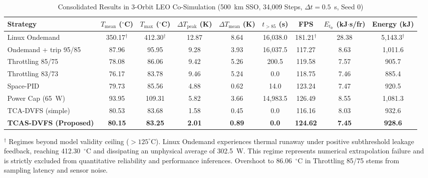 \documentclass[a4paper,fleqn]{cas-dc}
\begin{document}
\begin{table}[t]
\caption{Consolidated Results in 3-Orbit LEO Co-Simulation (500~km SSO, 34,009 Steps, $\Delta t = 0.5$~s, Seed 0)}
\label{tab:results_completo}
\centering
\footnotesize
\setlength{\tabcolsep}{3pt}
\begin{tabular*}{\textwidth}{@{\extracolsep{\fill}}lcccccccc@{}}
\toprule
\textbf{Strategy} & \textbf{$T_{\text{mean}}$ ($^\circ$C)} & \textbf{$T_{\max}$ ($^\circ$C)} & \textbf{$\Delta T_{\text{peak}}$ (K)} & \textbf{$\Delta T_{\text{mean}}$ (K)} & \textbf{$t_{>85}$ (s)} & \textbf{FPS} & \textbf{$E_{t_{\mathrm{fr}}}$ (kJ$\cdot$s/fr)} & \textbf{Energy (kJ)} \\
\midrule
Linux Ondemand & 350.17$^\dagger$ & 412.30$^\dagger$ & 12.87 & 8.64 & 16,038.0 & 181.21$^\dagger$ & 28.38 & 5,143.3$^\dagger$ \\
Ondemand + trip 95/85 & 87.96 & 95.95 & 9.28 & 3.93 & 16,037.5 & 117.27 & 8.63 & 1,011.6 \\
Throttling 85/75 & 78.08 & 86.06 & 9.42 & 5.26 & 200.5 & 119.58 & 7.57 & 905.7 \\
Throttling 83/73 & 76.17 & 83.78 & 9.46 & 5.24 & 0.0 & 118.75 & 7.46 & 885.4 \\
Space-PID & 79.73 & 85.56 & 4.88 & 0.62 & 14.0 & 123.24 & 7.47 & 920.5 \\
Power Cap (65~W) & 93.95 & 109.31 & 5.82 & 3.66 & 14,983.5 & 126.49 & 8.55 & 1,081.3 \\
TCA-DVFS (simple) & 80.53 & 83.68 & 1.58 & 0.45 & 0.0 & 116.16 & 8.03 & 932.6 \\
\midrule[\heavyrulewidth]
\textbf{TCAS-DVFS (Proposed)} & \textbf{80.15} & \textbf{83.25} & \textbf{2.01} & \textbf{0.89} & \textbf{0.0} & \textbf{124.62} & \textbf{7.45} & \textbf{928.6} \\
\bottomrule
\end{tabular*}
\par\vspace{2pt}\footnotesize
$^\dagger$ Regimes beyond model validity ceiling ($>125^\circ$C). Linux Ondemand experiences thermal runaway under positive subthreshold leakage feedback, reaching 412.30~$^\circ$C and dissipating an unphysical average of 302.5~W. This regime represents numerical extrapolation failure and is strictly excluded from quantitative reliability and performance inferences. Overshoot to 86.06~$^\circ$C in Throttling 85/75 stems from sampling latency and sensor noise.
\end{table}
\end{document}
